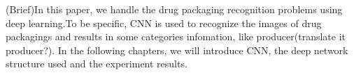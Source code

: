 ﻿\begin{abstract}
(粗略)本文使用深度学习技术来做药物盒的识别问题，即利用卷积神经网络(CNN)对药物包装盒的图片进行识别，得到其分类信息，如生产厂商等。在下面几个章节里，我们将介绍有关CNN及其原理，我们所使用的神经网络的结构，以及实验的结果。

\end{abstract}

\begin{enabstract}
(Brief)In this paper, we handle the drug packaging recognition problems using deep learning.To be specific, CNN is used to recognize the images of drug packagings and results in some categories infomation, like producer(translate it producer?). In the following chapters, we will introduce CNN, the deep network structure used and the experiment results.

\end{enabstract}
